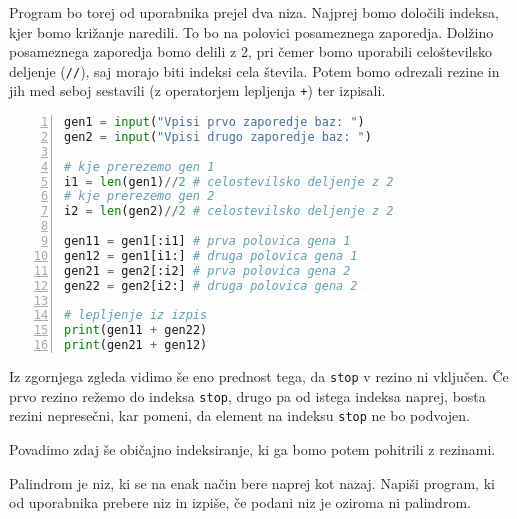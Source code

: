 \begin{resitev}
Program bo torej od uporabnika prejel dva niza. Najprej bomo določili indeksa, kjer bomo križanje naredili. To bo na polovici posameznega zaporedja. Dolžino posameznega zaporedja bomo delili z 2, pri čemer bomo uporabili celoštevilsko deljenje (\texttt{//}), saj morajo biti indeksi cela števila. Potem bomo odrezali rezine in jih med seboj sestavili (z operatorjem lepljenja \texttt{+}) ter izpisali.
\begin{lstlisting}[language=Python,numbers=left]
gen1 = input("Vpisi prvo zaporedje baz: ")
gen2 = input("Vpisi drugo zaporedje baz: ")

# kje prerezemo gen 1
i1 = len(gen1)//2 # celostevilsko deljenje z 2
# kje prerezemo gen 2
i2 = len(gen2)//2 # celostevilsko deljenje z 2

gen11 = gen1[:i1] # prva polovica gena 1
gen12 = gen1[i1:] # druga polovica gena 1
gen21 = gen2[:i2] # prva polovica gena 2
gen22 = gen2[i2:] # druga polovica gena 2

# lepljenje iz izpis
print(gen11 + gen22) 
print(gen21 + gen12)
\end{lstlisting}
\end{resitev}
Iz zgornjega zgleda vidimo še eno prednost tega, da \texttt{stop} v rezino ni vključen. Če prvo rezino režemo do indeksa \texttt{stop}, drugo pa od istega indeksa naprej, bosta rezini nepresečni, kar pomeni, da element na indeksu \texttt{stop} ne bo podvojen.

Povadimo zdaj še običajno indeksiranje, ki ga bomo potem pohitrili z rezinami.

\begin{zgled}
Palindrom je niz, ki se na enak način bere naprej kot nazaj. Napiši program, ki od uporabnika prebere niz in izpiše, če podani niz je oziroma ni palindrom.
\end{zgled}

